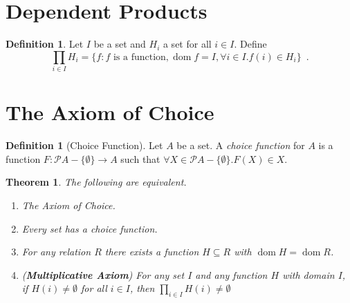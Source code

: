\documentclass{report}
\newtheorem{theorem}[axiom]{Theorem}
\theoremstyle{definition}
\newtheorem{definition}[axiom]{Definition}
\newcommand{\dom}{\ensuremath{\operatorname{dom}}}
\begin{document}
    \section{Dependent Products}

    \begin{definition}
        Let $I$ be a set and $H_i$ a set for all $i \in I$. Define
        \[ \prod_{i \in I} H_i = \{ f : \text{$f$ is a function}, \dom f = I, \forall i \in I. f(i) \in H_i \} \enspace . \]
    \end{definition}

    \section{The Axiom of Choice}

    \begin{definition}[Choice Function]
        Let $A$ be a set. A \emph{choice function} for $A$ is a function $F : \mathcal{P} A - \{ \emptyset \}
        \rightarrow A$ such that $\forall X \in \mathcal{P} A - \{ \emptyset \}. F(X) \in X$.
    \end{definition}

    \begin{theorem}
        The following are equivalent.
        \begin{enumerate}
            \item The Axiom of Choice.
            \item Every set has a choice function.
            \item 
            For any relation $R$ there exists a function $H \subseteq R$ with $\dom H = \dom R$.
            \item (\textbf{Multiplicative Axiom}) For any set $I$ and any function $H$ with domain
            $I$, if $H(i) \neq \emptyset$ for all $i \in I$, then $\prod_{i \in I} H(i) \neq \emptyset$
        \end{enumerate}
    \end{theorem}
\end{document}
